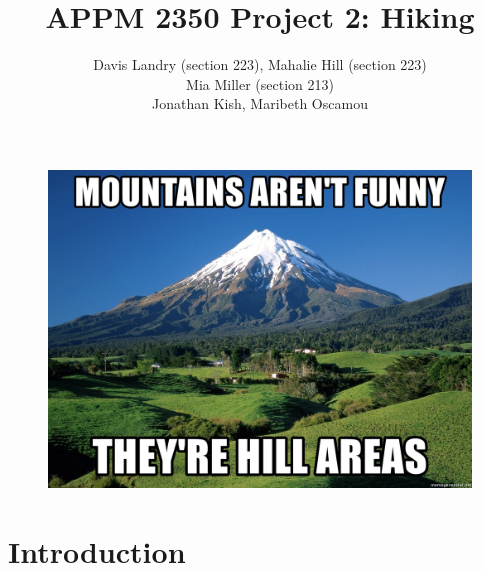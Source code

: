 \documentclass[12pt]{article}   %
\theoremstyle{definition}
\numberwithin{equation}{section}
\begin{document}
\parskip10pt
\parindent0pt
\baselineskip15pt
\doublespacing

\title{APPM 2350 Project 2: Hiking}
\author{Davis Landry (section 223), Mahalie Hill (section 223)\\Mia Miller (section 213) \\ Jonathan Kish, Maribeth Oscamou}

\pagestyle{fancy}
\renewcommand{\sectionmark}[1]{\markright{#1}{}}

\fancyhf{}

\rhead{\fancyplain{}{\thepage}} %
\lhead{\fancyplain{}{\rightmark }} %

\maketitle
\begin{figure} [h]
  \centering
  \includegraphics[width=13cm]{../images/mountains-arent-funny-theyre-hill-areas.jpg}
  \label{fig:coverPage}
\end{figure}

\newpage
\tableofcontents
\newpage
\newpage
{}

\section{Introduction} \label{APPM2350proj01sec01}
\end{document}
